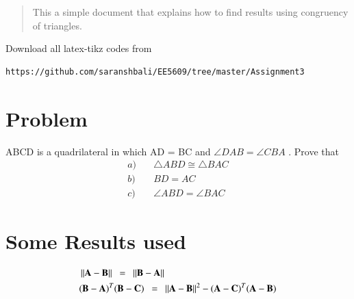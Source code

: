 \documentclass[journal,12pt,twocolumn]{IEEEtran}
\begin{document}
%
\begin{abstract}
This a simple document that explains how to find results using congruency of triangles.
\end{abstract}
%
%
Download all latex-tikz codes from 
%
\begin{lstlisting}
https://github.com/saranshbali/EE5609/tree/master/Assignment3
\end{lstlisting}
%
\section{Problem}
ABCD is a quadrilateral in which AD = BC and $\angle{DAB}  = \angle{CBA}$ . Prove that
\begin{align}
a) & \quad	\triangle ABD \cong \triangle BAC \\
b) & \quad BD = AC \\ 
c) & \quad \angle ABD = \angle BAC
\end{align}
\section{Some Results used}
\begin{align}
 & \left\lVert\mathbf{A}-\mathbf{B}\right\rVert \enspace = \enspace   \left\lVert\mathbf{B}-\mathbf{A}\right\rVert \\
 & (\mathbf{B}-\mathbf{A})^T(\mathbf{B}-\mathbf{C}) \enspace = \enspace \left\lVert\mathbf{A}-\mathbf{B}\right\rVert^2 - (\mathbf{A}-\mathbf{C})^T(\mathbf{A}-\mathbf{B}) 
\end{align}
\end{document}
